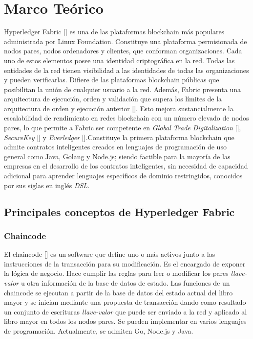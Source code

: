 \chapter{Marco Teórico}\label{chapter:theoretical_framework}

Hyperledger Fabric [\cite{HF}] es una de las plataformas blockchain m\'as populares administrada por Linux Foundation. Constituye una plataforma permisionada de nodos pares, nodos ordenadores y clientes, que conforman organizaciones. Cada uno de estos elementos posee una identidad criptogr\'afica en la red. Todas las entidades de la red tienen visibilidad a las identidades de todas las organizaciones y pueden verificarlas. Difiere de las plataformas blockchain p\'ublicas que posibilitan la uni\'on de cualquier usuario a la red. Adem\'as, Fabric presenta una arquitectura de ejecuci\'on, orden y validaci\'on que supera los l\'imites de la arquitectura de orden y ejecuci\'on anterior [\cite{androulaki2018hyperledger}]. Esto mejora sustancialmente la escalabilidad de rendimiento en redes blockchain con un n\'umero elevado de nodos pares, lo que permite a Fabric ser competente en \emph{Global Trade Digitalization} [\cite{digitizing-global}], \emph{SecureKey} [\cite{securekey}] y \emph{Everledger} [\cite{everledger}].Constituye la primera plataforma blockchain que admite contratos inteligentes creados en lenguajes de programaci\'on de uso general como Java, Golang y Node.js; siendo factible para la mayor\'ia de las empresas en el desarrollo de los contratos inteligentes, sin necesidad de capacidad adicional para aprender lenguajes espec\'ificos de dominio restringidos, conocidos por sus siglas en ingl\'es \emph{DSL}. 

\section{Principales conceptos de Hyperledger Fabric}

\subsection{Chaincode}
El chaincode [\cite{Chaincode}] es un software que define uno o m\'as activos junto a las instrucciones de la transacci\'on para su modificaci\'on. Es el encargado de exponer la l\'ogica de negocio. Hace cumplir las reglas para leer o modificar los pares \emph{llave-valor} u otra informaci\'on de la base de datos de estado. Las funciones de un chaincode se ejecutan a partir de la base de datos del estado actual del libro mayor y se inician mediante una propuesta de transacci\'on dando como resultado un conjunto de escrituras \emph{llave-valor} que puede ser enviado a la red y aplicado al libro mayor en todos los nodos pares. Se pueden implementar en varios lenguajes de programaci\'on. Actualmente, se admiten Go, Node.js y Java.



